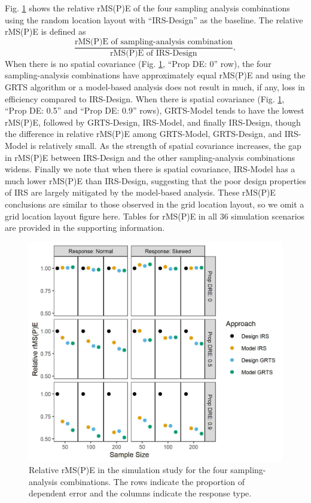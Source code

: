 \documentclass[]{elsarticle} %
\begin{document}
Fig. \ref{fig:rmspe_eff} shows the relative rMS(P)E of the four sampling
analysis combinations using the random location layout with
``IRS-Design'' as the baseline. The relative rMS(P)E is defined as
\begin{equation*}
\frac{\text{rMS(P)E of sampling-analysis combination}}{\text{rMS(P)E of IRS-Design}},
\end{equation*} When there is no spatial covariance (Fig.
\ref{fig:rmspe_eff}, ``Prop DE: 0'' row), the four sampling-analysis
combinations have approximately equal rMS(P)E and using the GRTS
algorithm or a model-based analysis does not result in much, if any,
loss in efficiency compared to IRS-Design. When there is spatial
covariance (Fig. \ref{fig:rmspe_eff}, ``Prop DE: 0.5'' and ``Prop DE:
0.9'' rows), GRTS-Model tends to have the lowest rMS(P)E, followed by
GRTS-Design, IRS-Model, and finally IRS-Design, though the difference in
relative rMS(P)E among GRTS-Model, GRTS-Design, and IRS-Model is
relatively small. As the strength of spatial covariance increases, the
gap in rMS(P)E between IRS-Design and the other sampling-analysis
combinations widens. Finally we note that when there is spatial
covariance, IRS-Model has a much lower rMS(P)E than IRS-Design,
suggesting that the poor design properties of IRS are largely mitigated
by the model-based analysis. These rMS(P)E conclusions are similar to
those observed in the grid location layout, so we omit a grid location
layout figure here. Tables for rMS(P)E in all 36 simulation scenarios
are provided in the supporting information.

\begin{figure}
  \centering
  \includegraphics[width = 1\linewidth]{figures/rmspe_eff.jpeg}
  \caption{Relative rMS(P)E in the simulation study for the four sampling-analysis combinations. The rows indicate the proportion of dependent error and the columns indicate the response type.}
  \label{fig:rmspe_eff}
\end{figure}
\end{document}

